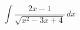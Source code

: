 \documentclass[../rgr1.tex]{subfiles}
\begin{document}
\Solution

\begin{equation}
	\int \frac{2x - 1}{ \sqrt{x^2 - 3x + 4} } \, dx
\end{equation}

\Answer{
	<++>
}
\end{document}
